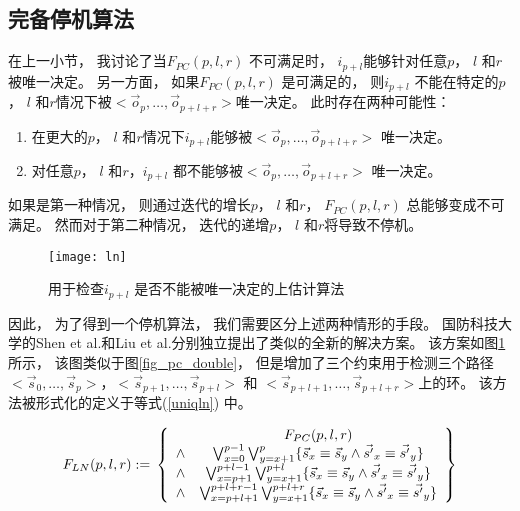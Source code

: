 \subsection{完备停机算法}\label{subsec_complete}


在上一小节，
我讨论了当$F_{PC}(p,l,r)$ 不可满足时，
$i_{p+l}$能够针对任意$p$， $l$ 和$r$被唯一决定。
另一方面，
如果$F_{PC}(p,l,r)$ 是可满足的，
则$i_{p+l}$ 不能在特定的$p$， $l$ 和$r$情况下被$<\vec{o}_{p},\dots,\vec{o}_{p+l+r}>$唯一决定。
此时存在两种可能性：
\begin{enumerate}
 \item
在更大的$p$， $l$ 和$r$情况下$i_{p+l}$能够被$<\vec{o}_{p},\dots,\vec{o}_{p+l+r}>$ 唯一决定。
 \item
对任意$p$， $l$ 和$r$，$i_{p+l}$ 都不能够被$<\vec{o}_{p},\dots,\vec{o}_{p+l+r}>$ 唯一决定。
\end{enumerate}

如果是第一种情况，
则通过迭代的增长$p$， $l$ 和$r$，
$F_{PC}(p,l,r)$ 总能够变成不可满足。
然而对于第二种情况，
迭代的递增$p$， $l$ 和$r$将导致不停机。

\begin{figure}[t]
\begin{center}
\texttt{[image: ln]}
\end{center}
\caption{用于检查$i_{p+l}$ 是否不能被唯一决定的上估计算法}
  \label{fig_ln_double}
\end{figure}

因此，
为了得到一个停机算法，
我们需要区分上述两种情形的手段。
国防科技大学的Shen et al.和Liu et al.分别独立提出了类似的全新的解决方案。
该方案如图\ref{fig_ln_double}所示，
该图类似于图\ref{fig_pc_double}，
但是增加了三个约束用于检测三个路径$<\vec{s}_{0},\dots,\vec{s}_{p}>$，$<\vec{s}_{p+1},\dots,\vec{s}_{p+l}>$ 和
$<\vec{s}_{p+l+1},\dots,\vec{s}_{p+l+r}>$上的环。
该方法被形式化的定义于等式(\ref{uniqln}) 中。

\begin{equation}\label{uniqln}
F_{LN}(p,l,r):=\\
\left\{
\begin{array}{cc}
&F_{PC}(p,l,r)\\
\wedge&\bigvee_{x=0}^{p-1}\bigvee_{y=x+1}^{p} \{\vec{s}_x\equiv \vec{s}_y\wedge \vec{s'}_x\equiv \vec{s'}_y\} \\
\wedge&\bigvee_{x=p+1}^{p+l-1}\bigvee_{y=x+1}^{p+l} \{\vec{s}_x\equiv \vec{s}_y\wedge \vec{s'}_x\equiv \vec{s'}_y\} \\
\wedge&\bigvee_{x=p+l+1}^{p+l+r-1}\bigvee_{y=x+1}^{p+l+r} \{\vec{s}_x\equiv \vec{s}_y\wedge \vec{s'}_x\equiv \vec{s'}_y\}
\end{array}
\right\}
\end{equation}


